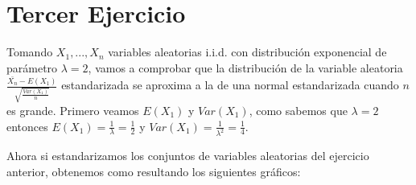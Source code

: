 \documentclass[a4paper]{article}
\begin{document}
	\begin{figure}[H]
		\centering
	\end{figure}
	
	\newpage
	
	\section{Tercer Ejercicio}
	
	Tomando $X_1,...,X_n$ variables aleatorias i.i.d. con distribuci\'on exponencial de par\'ametro $\lambda = 2$, vamos a comprobar que la distribuci\'on de la variable aleatoria $\frac{\bar{X_n} - E(X_1)}{\sqrt{\frac{Var(X_1)}{n}}}$ estandarizada se aproxima a la de una normal estandarizada cuando $n$ es grande.
	Primero veamos $E(X_1)$ y $Var(X_1)$, como sabemos que $\lambda = 2$ entonces $E(X_1) = \frac{1}{\lambda} = \frac{1}{2}$ y $Var(X_1) = \frac{1}{\lambda^2} = \frac{1}{4}$.
	\smallskip
	
	Ahora si estandarizamos los conjuntos de variables aleatorias del ejercicio anterior, obtenemos como resultando los siguientes gr\'aficos:
	
\end{document}
